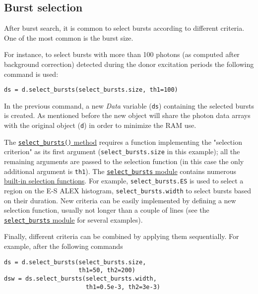 \subsection{Burst selection}
\label{sec:burstsel}

After burst search, it is common to select bursts according to different
criteria. One of the most common is the burst size.

For instance, to select bursts with more than 100 photons (as computed
after background correction) detected during the donor excitation periods
the following command is used:

\begin{verbatim}
ds = d.select_bursts(select_bursts.size, th1=100)
\end{verbatim}

In the previous command, a new \textit{Data} variable (\verb|ds|) containing
the selected bursts is created.
As mentioned before the new object will share the photon data
arrays with the original object (\verb|d|) in order to minimize the RAM use.

The
\href{http://fretbursts.readthedocs.org/en/latest/data_class.html#burst-selection-methods}{\texttt{select\_bursts()} method}
requires a function implementing the "selection criterion" as its first argument
(\verb|select_bursts.size| in this example);
all the remaining arguments are passed to the selection function (in this case
the only additional argument is \verb|th1|).
The \href{http://fretbursts.readthedocs.org/en/latest/burst_selection.html}{\texttt{select\_bursts} module}
contains numerous
\href{http://fretbursts.readthedocs.org/en/latest/burst_selection.html#module-fretbursts.select_bursts}{built-in selection functions}.
For example,
\verb|select_bursts.ES|
is used to select a region on the E-S ALEX histogram,
\verb|select_bursts.width|
to select bursts based on their duration.
New criteria can be easily implemented by defining a new selection function,
usually not longer than a couple of lines (see the
\href{https://github.com/tritemio/FRETBursts/blob/master/fretbursts/select\_bursts.py}{\texttt{select\_bursts} module} for several examples).

Finally, different criteria can be combined by applying them sequentially.
For example, after the following commands

\begin{verbatim}
ds = d.select_bursts(select_bursts.size,
                     th1=50, th2=200)
dsw = ds.select_bursts(select_bursts.width,
                       th1=0.5e-3, th2=3e-3)
\end{verbatim}

